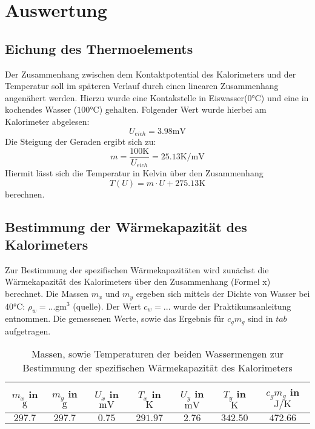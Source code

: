 \section{Auswertung}
\subsection{Eichung des Thermoelements}
Der Zusammenhang zwischen dem Kontaktpotential des Kalorimeters und der Temperatur soll im späteren Verlauf
durch einen linearen Zusammenhang angenähert werden. Hierzu wurde eine Kontakstelle in Eiswasser($0 \si{\celsius}$)
und eine in kochendes Wasser ($100 \si{\celsius}$) gehalten. Folgender Wert wurde hierbei am Kalorimeter abgelesen:
\begin{equation}
  U_{eich} = 3.98 \si{\milli\volt}
\end{equation}
Die Steigung der Geraden ergibt sich zu:
\begin{equation}
  m = \frac{100 \si{\kelvin}}{U_{eich}} = 25.13 \si{\kelvin \per \milli\volt}
\end{equation}
Hiermit lässt sich die Temperatur in Kelvin über den Zusammenhang
\begin{equation}
  T(U) = m \cdot U + 275.13 \si{\kelvin}
  \label{eq: UtoTemp}
\end{equation}
berechnen.

\subsection{Bestimmung der Wärmekapazität des Kalorimeters}
Zur Bestimmung der spezifischen Wärmekapazitäten wird zunächst die Wärmekapazität des Kalorimeters über den Zusammenhang
(Formel x) berechnet. Die Massen $m_x$ und $m_y$ ergeben sich mittels der Dichte von Wasser bei $40\si{\celsius}$: $\rho_w = ...\si{\gram\meter^3}$ (quelle).
Der Wert $c_w = ...$ wurde der Praktikumsanleitung entnommen. Die gemessenen Werte, sowie das Ergebnis für $c_g m_g$ sind in $tab$ aufgetragen.
\begin{table}
  \centering
  \begin{tabular}{S S S S S S S}
      \toprule
    {$m_x$ in $\si{\gram}$} & {$m_y$ in $\si{\gram}$} &  {$U_x$ in $\si{\milli \volt}$} & {$T_x$ in $\si{\kelvin}$} & {$U_y$ in $\si{\milli \volt}$} &{$T_y$ in $\si{\kelvin}$} & {$c_g m_g$ in $\si{\joule \per \kelvin}$} \\
    \midrule
    $\num{297.7}$  &    $\num{297.7}$  &   $\num{0.75}$  &  $\num{291.97}$ &   $\num{2.76}$  &  $\num{342.50}$ &    $\num{472.66}$ \\

  \end{tabular}
  \caption{Massen, sowie Temperaturen der beiden Wassermengen zur Bestimmung der spezifischen Wärmekapazität des Kalorimeters}
  \label{tab: cgmg}
\end{table}

